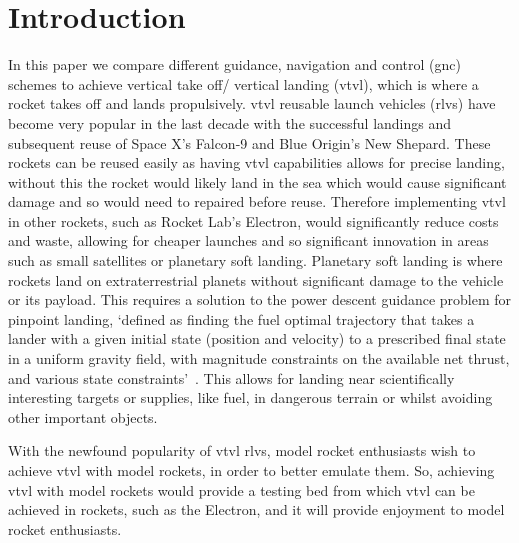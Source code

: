 \section{Introduction}
In this paper we compare different guidance, navigation and control (\gls{gnc}) schemes to achieve vertical take off/ vertical landing (\gls{vtvl}), which is where a rocket takes off and lands propulsively. 
\gls{vtvl} reusable launch vehicles (\glspl{rlv}) have become very popular in the last decade with the successful landings and subsequent reuse of Space X’s Falcon-9 and Blue Origin’s New Shepard. 
These rockets can be reused easily as having \gls{vtvl} capabilities allows for precise landing, without this the rocket would likely land in the sea which would cause significant damage and so would need to repaired before reuse.
Therefore implementing \gls{vtvl} in other rockets, such as Rocket Lab's Electron, would significantly reduce costs and waste, allowing for cheaper launches and so significant innovation in areas such as small satellites or planetary soft landing. Planetary soft landing is where rockets land on extraterrestrial planets without  significant damage to the vehicle or its payload.
This requires a solution to the power descent guidance problem for pinpoint landing, `defined as finding the fuel optimal trajectory that takes a lander with a given initial state (position and velocity) to a prescribed final state in a uniform gravity field, with magnitude constraints on the available net thrust, and various state constraints'~\cite{Aci2005}.
This allows for landing near scientifically interesting targets or supplies, like fuel, in dangerous terrain or whilst avoiding other important objects. 

With the newfound popularity of \gls{vtvl} \glspl{rlv}, model rocket enthusiasts wish to achieve \gls{vtvl} with model rockets, in order to better emulate them. 
So, achieving \gls{vtvl} with model rockets would provide a testing bed from which \gls{vtvl} can be achieved in rockets, such as the Electron, and it will provide enjoyment to model rocket enthusiasts.

